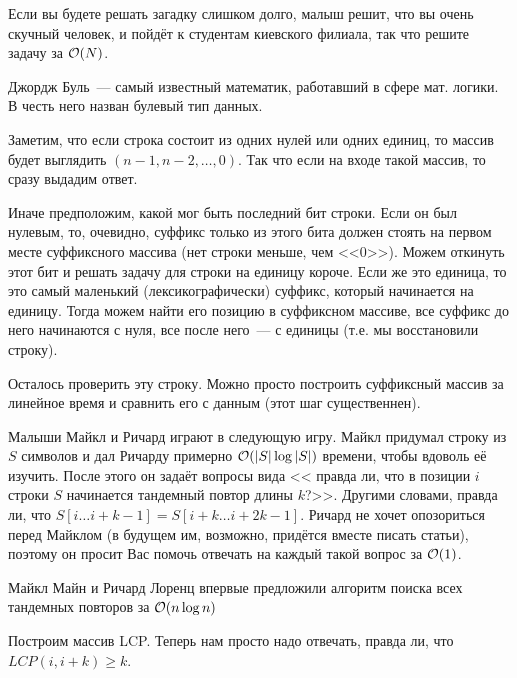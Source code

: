 \documentclass[addpoints]{exam}
\begin{document}
\begin{questions}
Если вы будете решать загадку слишком долго, малыш решит, что вы очень скучный человек, и пойдёт к студентам киевского филиала, так что решите задачу за $\mathcal{O}(N)$.

\begin{solution}

Джордж Буль~--- самый известный математик, работавший в сфере мат. логики. В честь него назван булевый тип данных.

Заметим, что если строка состоит из одних нулей или одних единиц, то массив будет выглядить $(n-1, n-2, \ldots, 0)$. Так что если на входе такой массив, то сразу выдадим ответ.

Иначе предположим, какой мог быть последний бит строки. Если он был нулевым, то, очевидно, суффикс только из этого бита должен стоять на первом месте суффиксного массива (нет строки меньше, чем <<0>>). Можем откинуть этот бит и решать задачу для строки на единицу короче. Если же это единица, то это самый маленький (лексикографически) суффикс, который начинается на единицу. Тогда можем найти его позицию в суффиксном массиве, все суффикс до него начинаются с нуля, все после него~--- с единицы (т.е. мы восстановили строку).

Осталось проверить эту строку. Можно просто построить суффиксный массив за линейное время и сравнить его с данным (этот шаг существеннен).

\end{solution}

\question[\half] \label{tandem} Малыши Майкл и Ричард играют в следующую игру. Майкл придумал строку из $S$ символов и дал Ричарду примерно $\mathcal{O}(|S| \log |S|)$ времени, чтобы вдоволь её изучить. После этого он задаёт вопросы вида << правда ли, что в позиции $i$ строки $S$ начинается тандемный повтор длины $k$?>>. Другими словами, правда ли, что $S[i\ldots i+k-1] = S[i+k \ldots i + 2k - 1]$. Ричард не хочет опозориться перед Майклом (в будущем им, возможно, придётся вместе писать статьи), поэтому он просит Вас помочь отвечать на каждый такой вопрос за $\mathcal{O}(1)$.

\begin{solution}

Майкл Майн и Ричард Лоренц впервые предложили алгоритм поиска всех тандемных повторов за $\mathcal{O}(n \log{n})$

Построим массив LCP. Теперь нам просто надо отвечать, правда ли, что $LCP(i,i+k) \geqslant k$.

\end{solution}


\end{questions}
\end{document}

